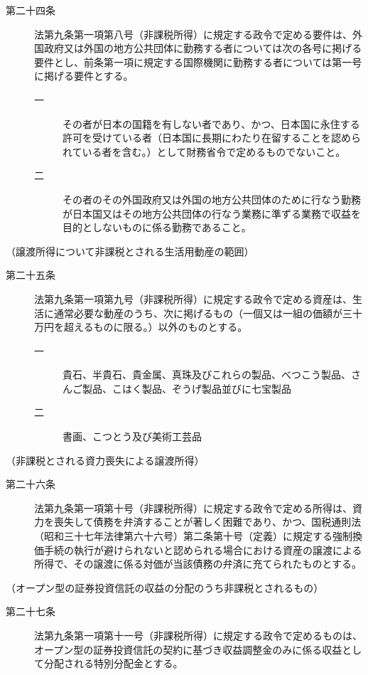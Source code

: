 \documentclass[twocolumn,a4j,10pt]{ltjtarticle}
\begin{document}
\begin{description}
\item[第二十四条]法第九条第一項第八号（非課税所得）に規定する政令で定める要件は、外国政府又は外国の地方公共団体に勤務する者については次の各号に掲げる要件とし、前条第一項に規定する国際機関に勤務する者については第一号に掲げる要件とする。
\begin{description}
\item[一]その者が日本の国籍を有しない者であり、かつ、日本国に永住する許可を受けている者（日本国に長期にわたり在留することを認められている者を含む。）として財務省令で定めるものでないこと。
\item[二]その者のその外国政府又は外国の地方公共団体のために行なう勤務が日本国又はその地方公共団体の行なう業務に準ずる業務で収益を目的としないものに係る勤務であること。
\end{description}
\end{description}
\noindent\hspace{10pt}（譲渡所得について非課税とされる生活用動産の範囲）
\begin{description}
\item[第二十五条]法第九条第一項第九号（非課税所得）に規定する政令で定める資産は、生活に通常必要な動産のうち、次に掲げるもの（一個又は一組の価額が三十万円を超えるものに限る。）以外のものとする。
\begin{description}
\item[一]貴石、半貴石、貴金属、真珠及びこれらの製品、べつこう製品、さんご製品、こはく製品、ぞうげ製品並びに七宝製品
\item[二]書画、こつとう及び美術工芸品
\end{description}
\end{description}
\noindent\hspace{10pt}（非課税とされる資力喪失による譲渡所得）
\begin{description}
\item[第二十六条]法第九条第一項第十号（非課税所得）に規定する政令で定める所得は、資力を喪失して債務を弁済することが著しく困難であり、かつ、国税通則法（昭和三十七年法律第六十六号）第二条第十号（定義）に規定する強制換価手続の執行が避けられないと認められる場合における資産の譲渡による所得で、その譲渡に係る対価が当該債務の弁済に充てられたものとする。
\end{description}
\noindent\hspace{10pt}（オープン型の証券投資信託の収益の分配のうち非課税とされるもの）
\begin{description}
\item[第二十七条]法第九条第一項第十一号（非課税所得）に規定する政令で定めるものは、オープン型の証券投資信託の契約に基づき収益調整金のみに係る収益として分配される特別分配金とする。
\end{description}
\end{document}
